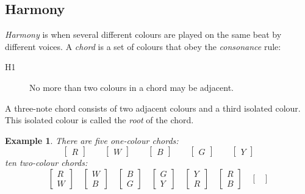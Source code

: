 \documentclass{scrartcl}
\newtheorem{example}{Example}
\begin{document}
\subsection{Harmony}
\emph{Harmony} is when several different colours are played on the same beat by different voices. A \emph{chord} is a set of colours that obey the \emph{consonance} rule:
\begin{description}
	\item[H1] No more than two colours in a chord may be adjacent.
\end{description}
A three-note chord consists of two adjacent colours and a third isolated colour. This isolated colour is called the \emph{root} of the chord.
\begin{example}
There are five one-colour chords:
\begin{equation}\nonumber
\begin{bmatrix}
R
\end{bmatrix}
\qquad
\begin{bmatrix}
W
\end{bmatrix}
\qquad
\begin{bmatrix}
B
\end{bmatrix}
\qquad
\begin{bmatrix}
G
\end{bmatrix}
\qquad
\begin{bmatrix}
Y
\end{bmatrix}
\end{equation}
ten two-colour chords:
\begin{equation}\nonumber
\begin{bmatrix}
R \\ W
\end{bmatrix}
\quad
\begin{bmatrix}
W \\ B
\end{bmatrix}
\quad
\begin{bmatrix}
B \\ G
\end{bmatrix}
\quad
\begin{bmatrix}
G \\ Y
\end{bmatrix}
\quad
\begin{bmatrix}
Y \\ R
\end{bmatrix}
\quad
\begin{bmatrix}
R \\ B
\end{bmatrix}
\quad
\begin{bmatrix}

\end{bmatrix}
\end{equation}
\end{example}
\end{document}
